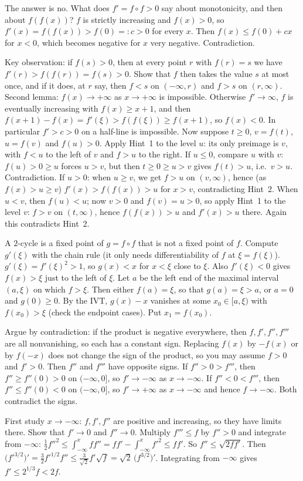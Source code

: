 \documentclass[11pt,a4paper]{article}
\begin{document}
 The answer is no. What does $f'=f\circ f>0$ say about monotonicity, and then about $f(f(x))$?
 $f$ is strictly increasing and $f(x)>0$, so $f'(x)=f(f(x))>f(0)=:c>0$ for every $x$.
 Then $f(x)\le f(0)+cx$ for $x<0$, which becomes negative for $x$ very negative. Contradiction.

 Key observation: if $f(s)>0$, then at every point $r$ with $f(r)=s$ we have $f'(r)>f(f(r))=f(s)>0$. Show that $f$ then takes the value $s$ at most once, and if it does, at $r$ say, then $f<s$ on $(-\infty,r)$ and $f>s$ on $(r,\infty)$.
 Second lemma: $f(x)\to+\infty$ as $x\to+\infty$ is impossible. Otherwise $f'\to\infty$, $f$ is eventually increasing with $f(x)\ge x+1$, and then
$f(x+1)-f(x)=f'(\xi)>f(f(\xi))\ge f(x+1)$, so $f(x)<0$. In particular $f'>c>0$ on a half-line is impossible.
 Now suppose $t\ge0$, $v=f(t)$, $u=f(v)$ and $f(u)>0$. Apply Hint~1 to the level $u$: its only preimage is $v$, with $f<u$ to the left of $v$ and $f>u$ to the right. If $u\le0$, compare $u$ with $v$: $f(u)>0\ge u$ forces $u>v$, but then $t\ge0\ge u>v$ gives $f(t)>u$, i.e.\ $v>u$. Contradiction.
 If $u>0$: when $u\ge v$, we get $f>u$ on $(v,\infty)$, hence (as $f(x)>u\ge v$) $f'(x)>f(f(x))>u$ for $x>v$, contradicting Hint~2. When $u<v$, then $f(u)<u$; now $v>0$ and $f(v)=u>0$, so apply Hint~1 to the level $v$: $f>v$ on $(t,\infty)$, hence $f(f(x))>u$ and $f'(x)>u$ there. Again this contradicts Hint~2.

 A $2$-cycle is a fixed point of $g=f\circ f$ that is not a fixed point of $f$. Compute $g'(\xi)$ with the chain rule (it only needs differentiability of $f$ at $\xi=f(\xi)$).
 $g'(\xi)=f'(\xi)^2>1$, so $g(x)<x$ for $x<\xi$ close to $\xi$. Also $f'(\xi)<0$ gives $f(x)>\xi$ just to the left of $\xi$.
 Let $a$ be the left end of the maximal interval $(a,\xi)$ on which $f>\xi$. Then either $f(a)=\xi$, so that $g(a)=\xi>a$, or $a=0$ and $g(0)\ge0$. By the IVT, $g(x)-x$ vanishes at some $x_0\in[a,\xi)$ with $f(x_0)>\xi$ (check the endpoint cases). Put $x_1=f(x_0)$.

 Argue by contradiction: if the product is negative everywhere, then $f,f',f'',f'''$ are all nonvanishing, so each has a constant sign.
 Replacing $f(x)$ by $-f(x)$ or by $f(-x)$ does not change the sign of the product, so you may assume $f>0$ and $f'>0$. Then $f''$ and $f'''$ have opposite signs.
 If $f''>0>f'''$, then $f''\ge f''(0)>0$ on $(-\infty,0]$, so $f'\to-\infty$ as $x\to-\infty$. If $f''<0<f'''$, then $f''\le f''(0)<0$ on $(-\infty,0]$, so $f'\to+\infty$ as $x\to-\infty$ and hence $f\to-\infty$. Both contradict the signs.

 First study $x\to-\infty$: $f,f',f''$ are positive and increasing, so they have limits there. Show that $f'\to0$ and $f''\to0$.
 Multiply $f'''\le f$ by $f''>0$ and integrate from $-\infty$: $\frac12 f''^2\le\int_{-\infty}^x ff''=ff'-\int_{-\infty}^x f'^2\le ff'$. So $f''\le\sqrt{2ff'}$.
 Then $\bigl(f'^{3/2}\bigr)'=\frac32 f'^{1/2}f''\le\frac{3}{\sqrt2}f'\sqrt f=\sqrt2\,\bigl(f^{3/2}\bigr)'$. Integrating from $-\infty$ gives $f'\le2^{1/3}f<2f$.
\end{document}
